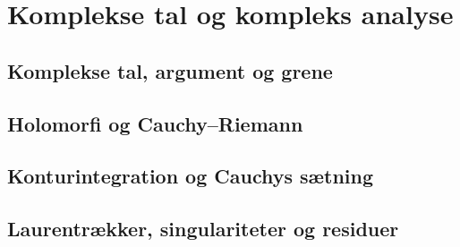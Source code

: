 \chapter{Komplekse tal og kompleks analyse}
\section{Komplekse tal, argument og grene}
\leavevmode\par

\section{Holomorfi og Cauchy–Riemann}
\leavevmode\par

\section{Konturintegration og Cauchys sætning}
\leavevmode\par

\section{Laurentrækker, singulariteter og residuer}
\leavevmode\par
